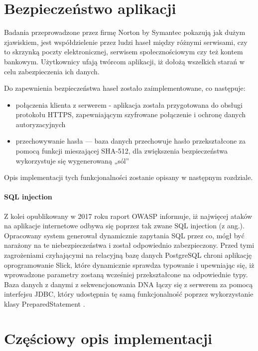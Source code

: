 \documentclass[a4paper,12pt,twoside]{article}
\begin{document}
\newpage
\section{Bezpieczeństwo aplikacji}
Badania przeprowadzone przez firmę Norton by Symantec \cite{nortonSec}
pokazują jak dużym zjawiskiem, jest współdzielenie przez ludzi haseł między różnymi serwisami, czy to
skrzynką poczty elektronicznej, serwisem społecznościowym czy też kontem bankowym.
Użytkownicy ufają twórcom aplikacji, iż dołożą wszelkich starań w celu zabezpieczenia ich
danych.

Do zapewnienia bezpieczeństwa haseł zostało zaimplementowane, co następuje:
\begin{itemize}
\item{połączenia klienta z serwerem} - aplikacja została przygotowana do obsługi protokołu HTTPS,
zapewniającym szyfrowane połączenie i ochronę danych autoryzacyjnych
\item{przechowywanie hasła — baza danych przechowuje hasło przekształcone za pomocą funkcji mieszającej SHA-512, dla zwiększenia bezpieczeństwa wykorzystuje się wygenerowaną „sól”
}
\end{itemize}

Opis implementacji tych funkcjonalności zostanie opisany w następnym rozdziale.

\paragraph{SQL injection} Z kolei opublikowany w 2017 roku raport OWASP \cite{owasp}
informuje, iż najwięcej ataków na aplikacje internetowe odbywa się poprzez tak zwane SQL injection (z ang.).
Opracowany system generował dynamicznie zapytania SQL przez co, mógł być narażony na te niebezpieczeństwa i został odpowiednio zabezpieczony.
Przed tymi zagrożeniami czyhającymi na relacyjną bazę danych PostgreSQL chroni aplikację oprogramowanie Slick, które dynamicznie sprawdza typowanie i upewniając się, iż wprowadzone parametry
zostaną wcześniej przekształcone na odpowiednie typy.
Baza danych z danymi z sekwencjonowania DNA łączy się z serwerem za pomocą interfejsu JDBC,
który udostępnia tę samą funkcjonalność poprzez wykorzystanie klasy PreparedStatement \cite{preparedStatement}.

\newpage

\section{Częściowy opis implementacji}
\end{document}
